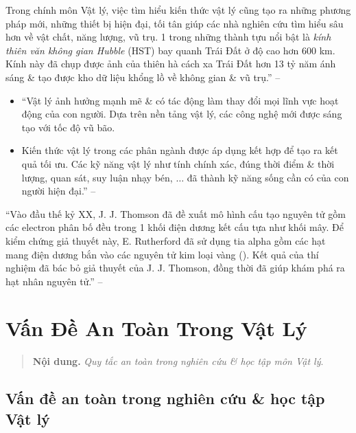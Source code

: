 \documentclass[oneside]{book}
\numberwithin{equation}{section}
\begin{document}
\begin{itemize}
	Trong chính môn Vật lý, việc tìm hiểu kiến thức vật lý cũng tạo ra những phương pháp mới, những thiết bị hiện đại, tối tân giúp các nhà nghiên cứu tìm hiểu sâu hơn về vật chất, năng lượng, vũ trụ. 1 trong những thành tựu nổi bật là \textit{kính thiên văn không gian Hubble} (HST) bay quanh Trái Đất ở độ cao hơn 600 km. Kính này đã chụp được ảnh của thiên hà cách xa Trái Đất hơn 13 tỷ năm ánh sáng \& tạo được kho dữ liệu khổng lồ về không gian \& vũ trụ.'' -- \cite[p. 10]{SGK_Vat_Ly_10_Chan_Troi_Sang_Tao}
\end{itemize}

\begin{itemize}
	\item ``Vật lý ảnh hưởng mạnh mẽ \& có tác động làm thay đổi mọi lĩnh vực hoạt động của con người. Dựa trên nền tảng vật lý, các công nghệ mới được sáng tạo với tốc độ vũ bão.
	\item Kiến thức vật lý trong các phân ngành được áp dụng kết hợp để tạo ra kết quả tối ưu. Các kỹ năng vật lý như tính chính xác, đúng thời điểm \& thời lượng, quan sát, suy luận nhạy bén, $\ldots$ đã thành kỹ năng sống cần có của con người hiện đại.'' -- \cite[p. 11]{SGK_Vat_Ly_10_Chan_Troi_Sang_Tao}
\end{itemize}
``Vào đầu thế kỷ XX, J. J. Thomson đã đề xuất mô hình cấu tạo nguyên tử gồm các electron phân bố đều trong 1 khối điện dương kết cấu tựa như khối mây. Để kiểm chứng giả thuyết này, E. Rutherford đã sử dụng tia alpha gồm các hạt mang điện dương bắn vào các nguyên tử kim loại vàng (\cite[Hình 1P.1: \textsf{Thí nghiệm Rutherford}, p. 11]{SGK_Vat_Ly_10_Chan_Troi_Sang_Tao}). Kết quả của thí nghiệm đã bác bỏ giả thuyết của J. J. Thomson, đồng thời đã giúp khám phá ra hạt nhân nguyên tử.'' -- \cite[p. 11]{SGK_Vat_Ly_10_Chan_Troi_Sang_Tao}


\section{Vấn Đề An Toàn Trong Vật Lý}

\begin{quotation}
	\textbf{Nội dung.} \textit{Quy tắc an toàn trong nghiên cứu \& học tập môn Vật lý}.
\end{quotation}

\subsection{Vấn đề an toàn trong nghiên cứu \& học tập Vật lý}
\end{document}
